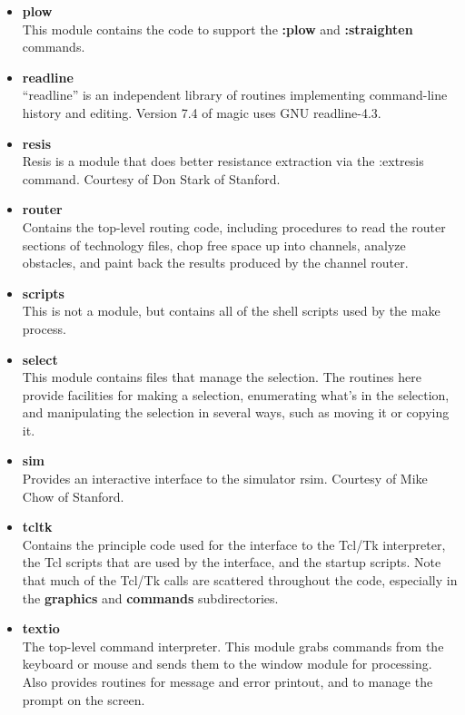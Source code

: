 \documentclass[letterpaper,twoside,12pt]{article}
\begin{document}
\begin{itemize}
\item {\bfseries plow}  \\
This module contains the code to support the {\bfseries :plow}
and {\bfseries :straighten} commands.

\item {\bfseries readline} \\
``readline'' is an independent library of routines implementing
command-line history and editing.  Version 7.4 of magic uses GNU
readline-4.3.

\item {\bfseries resis}  \\
Resis is a module that does better resistance extraction via
the :extresis command.  Courtesy of Don Stark of Stanford.

\item {\bfseries router}  \\
Contains the top-level routing code, including procedures
to read the router sections of technology files,
chop free space up into channels, analyze obstacles, and paint
back the results produced by the channel router.

\item {\bfseries scripts} \\
This is not a module, but contains all of the shell scripts used
by the make process.

\item {\bfseries select}  \\
This module contains files that manage the selection.  The routines
here provide facilities for making a selection, enumerating what's
in the selection, and manipulating the selection in several ways,
such as moving it or copying it.

\item {\bfseries sim}  \\
Provides an interactive interface to the simulator rsim.  Courtesy of
Mike Chow of Stanford.

\item {\bfseries tcltk}  \\
Contains the principle code used for the interface to the Tcl/Tk
interpreter, the Tcl scripts that are used by the interface, and
the startup scripts.  Note that much of the Tcl/Tk calls are
scattered throughout the code, especially in the {\bfseries
graphics} and {\bfseries commands} subdirectories.

\item {\bfseries textio}  \\
The top-level command interpreter.  This module grabs commands
from the keyboard or mouse and sends them to the window module
for processing.  Also provides routines for message and error
printout, and to manage the prompt on the screen.


\end{itemize}
\end{document}
